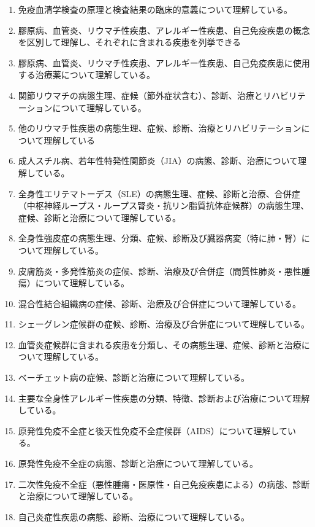 \begin{enumerate}
\def\labelenumi{\arabic{enumi}.}
\tightlist
\item
  免疫血清学検査の原理と検査結果の臨床的意義について理解している。
\item
  膠原病、血管炎、リウマチ性疾患、アレルギー性疾患、自己免疫疾患の概念を区別して理解し、それぞれに含まれる疾患を列挙できる
\item
  膠原病、血管炎、リウマチ性疾患、アレルギー性疾患、自己免疫疾患に使用する治療薬について理解している。
\item
  関節リウマチの病態生理、症候（節外症状含む）、診断、治療とリハビリテーションについて理解している。
\item
  他のリウマチ性疾患の病態生理、症候、診断、治療とリハビリテーションについて理解している
\item
  成人スチル病、若年性特発性関節炎（JIA）の病態、診断、治療について理解している。
\item
  全身性エリテマトーデス（SLE）の病態生理、症候、診断と治療、合併症（中枢神経ループス・ループス腎炎・抗リン脂質抗体症候群）の病態生理、症候、診断と治療について理解している。
\item
  全身性強皮症の病態生理、分類、症候、診断及び臓器病変（特に肺・腎）について理解している。
\item
  皮膚筋炎・多発性筋炎の症候、診断、治療及び合併症（間質性肺炎・悪性腫瘍）について理解している。
\item
  混合性結合組織病の症候、診断、治療及び合併症について理解している。
\item
  シェーグレン症候群の症候、診断、治療及び合併症について理解している。
\item
  血管炎症候群に含まれる疾患を分類し、その病態生理、症候、診断と治療について理解している。
\item
  ベーチェット病の症候、診断と治療について理解している。
\item
  主要な全身性アレルギー性疾患の分類、特徴、診断および治療について理解している。
\item
  原発性免疫不全症と後天性免疫不全症候群（AIDS）について理解している。
\item
  原発性免疫不全症の病態、診断と治療について理解している。
\item
  二次性免疫不全症（悪性腫瘍・医原性・自己免疫疾患による）の病態、診断と治療について理解している。
\item
  自己炎症性疾患の病態、診断、治療について理解している。
\end{enumerate}

